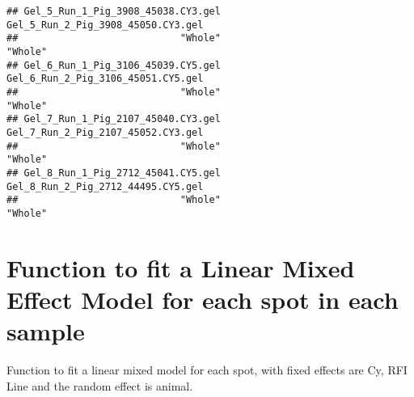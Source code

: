 \documentclass{article}\usepackage[]{graphicx}\usepackage[]{color}
\makeatletter
\newenvironment{kframe}{%
 \def\at@end@of@kframe{}%
 \ifinner\ifhmode%
  \def\at@end@of@kframe{\end{minipage}}%
  \begin{minipage}{\columnwidth}%
 \fi\fi%
 \def\FrameCommand##1{\hskip\@totalleftmargin \hskip-\fboxsep
 \colorbox{shadecolor}{##1}\hskip-\fboxsep
     \hskip-\linewidth \hskip-\@totalleftmargin \hskip\columnwidth}%
 \MakeFramed {\advance\hsize-\width
   \@totalleftmargin\z@ \linewidth\hsize
   \@setminipage}}%
 {\par\unskip\endMakeFramed%
 \at@end@of@kframe}
\newenvironment{knitrout}{}{} %
\makeatother
\begin{document}
\begin{knitrout}
\begin{kframe}
\begin{verbatim}
## Gel_5_Run_1_Pig_3908_45038.CY3.gel Gel_5_Run_2_Pig_3908_45050.CY3.gel 
##                            "Whole"                            "Whole" 
## Gel_6_Run_1_Pig_3106_45039.CY5.gel Gel_6_Run_2_Pig_3106_45051.CY5.gel 
##                            "Whole"                            "Whole" 
## Gel_7_Run_1_Pig_2107_45040.CY3.gel Gel_7_Run_2_Pig_2107_45052.CY3.gel 
##                            "Whole"                            "Whole" 
## Gel_8_Run_1_Pig_2712_45041.CY5.gel Gel_8_Run_2_Pig_2712_44495.CY5.gel 
##                            "Whole"                            "Whole"
\end{verbatim}
\end{kframe}
\end{knitrout}

\section{Function to fit a Linear Mixed Effect Model for each spot in each sample }
Function to fit a linear mixed model for each spot, with fixed effects are Cy, RFI Line and the random effect is animal.
\end{document}
